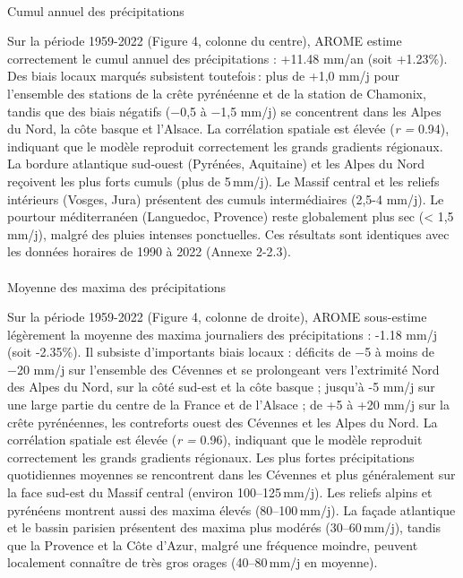 \documentclass[
  article,
  nofooter,
  noheadings]{jss}
\makeatletter
\let\oldparagraph\paragraph
\renewcommand{\paragraph}{
    \@ifstar
      \xxxParagraphStar
      \xxxParagraphNoStar
  }
\newcommand{\xxxParagraphStar}[1]{\oldparagraph*{#1}\mbox{}}
\newcommand{\xxxParagraphNoStar}[1]{\oldparagraph{#1}\mbox{}}
\makeatother
\begin{document}

\paragraph{Cumul annuel des
précipitations}\label{cumul-annuel-des-pruxe9cipitations}

Sur la période 1959-2022 (Figure 4, colonne du centre), AROME estime
correctement le cumul annuel des précipitations : +11.48 mm/an (soit
+1.23\%). Des biais locaux marqués subsistent toutefois\,: plus de +1,0
mm/j pour l'ensemble des stations de la crête pyrénéenne et de la
station de Chamonix, tandis que des biais négatifs (−0,5 à −1,5 mm/j) se
concentrent dans les Alpes du Nord, la côte basque et l'Alsace. La
corrélation spatiale est élevée (\emph{r =} 0.94), indiquant que le
modèle reproduit correctement les grands gradients régionaux. La bordure
atlantique sud‑ouest (Pyrénées, Aquitaine) et les Alpes du Nord
reçoivent les plus forts cumuls (plus de 5\,mm/j). Le Massif central et
les reliefs intérieurs (Vosges, Jura) présentent des cumuls
intermédiaires (2,5-4 mm/j). Le pourtour méditerranéen (Languedoc,
Provence) reste globalement plus sec (\textless{} 1,5 mm/j), malgré des
pluies intenses ponctuelles. Ces résultats sont identiques avec les
données horaires de 1990 à 2022 (Annexe 2-2.3).

\paragraph{Moyenne des maxima des
précipitations}\label{moyenne-des-maxima-des-pruxe9cipitations}

Sur la période 1959-2022 (Figure 4, colonne de droite), AROME
sous-estime légèrement la moyenne des maxima journaliers des
précipitations : -1.18 mm/j (soit -2.35\%). Il subsiste d'importants
biais locaux : déficits de −5 à moins de −20 mm/j sur l'ensemble des
Cévennes et se prolongeant vers l'extrimité Nord des Alpes du Nord, sur
la côté sud-est et la côte basque ; jusqu'à -5 mm/j sur une large partie
du centre de la France et de l'Alsace ; de +5 à +20 mm/j sur la crête
pyrénéennes, les contreforts ouest des Cévennes et les Alpes du Nord. La
corrélation spatiale est élevée (\emph{r =} 0.96), indiquant que le
modèle reproduit correctement les grands gradients régionaux. Les plus
fortes précipitations quotidiennes moyennes se rencontrent dans les
Cévennes et plus généralement sur la face sud-est du Massif central
(environ 100--125\,mm/j). Les reliefs alpins et pyrénéens montrent aussi
des maxima élevés (80--100\,mm/j). La façade atlantique et le bassin
parisien présentent des maxima plus modérés (30--60\,mm/j), tandis que
la Provence et la Côte d'Azur, malgré une fréquence moindre, peuvent
localement connaître de très gros orages (40--80\,mm/j en moyenne).
\end{document}

